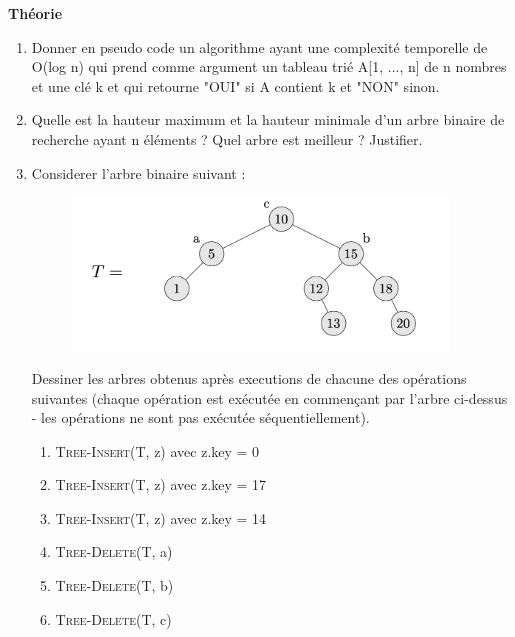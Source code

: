\begin{Exercice}[20 minutes]\textbf{Théorie}\\
	\begin{enumerate}
		\item Donner en pseudo code un algorithme ayant une complexité temporelle de O(log n) qui prend comme argument un tableau trié A[1, ..., n] de n nombres et une clé k et qui retourne "OUI" si A contient k et "NON" sinon.
		\item Quelle est la hauteur maximum et la hauteur minimale d'un arbre binaire de recherche ayant n éléments ? Quel arbre est meilleur ? Justifier.
		\item Considerer l'arbre binaire suivant : \\
		\begin{figure}[h!]
        			\centering
       	 		\includegraphics[width=10cm]{resources/exoArbreBinEnonce.png}
	    	\end{figure}
		Dessiner les arbres obtenus après executions de chacune des opérations suivantes (chaque opération est exécutée en commençant par l'arbre ci-dessus - les opérations ne sont pas exécutée séquentiellement).
		\begin{enumerate}
			\item \textsc{Tree-Insert}(T, z) avec z.key = 0
			\item \textsc{Tree-Insert}(T, z) avec z.key = 17
			\item \textsc{Tree-Insert}(T, z) avec z.key = 14
			\item \textsc{Tree-Delete}(T, a)
			\item \textsc{Tree-Delete}(T, b)
			\item \textsc{Tree-Delete}(T, c)
		\end{enumerate}



\end{enumerate}
\end{Exercice}
